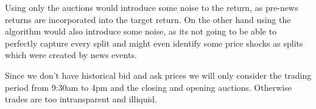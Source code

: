 \documentclass[12pt,a4paper]{article}
\begin{document}
	Using only the auctions would introduce some noise to the return, as pre-news returns are incorporated into the
	target return.
	On the other hand using the algorithm would also introduce some noise, as its not going to be able to perfectly capture every split and might even identify some price shocks as splits which were created by news events.
	
	Since we don't have historical bid and ask prices we will only consider the trading period from 9:30am to 4pm and the closing and opening auctions.
	Otherwise trades are too intransparent and illiquid.
	
%	
	
	
	
	
	
	
	
\end{document}
